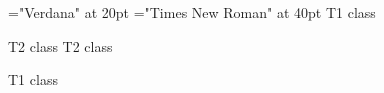 \font\tbta="Verdana" at 20pt
\font\ta="Times New Roman" at 40pt
\ta T1 class 

\tbta T2 class T2 class 

\ta T1 class 


\bye
